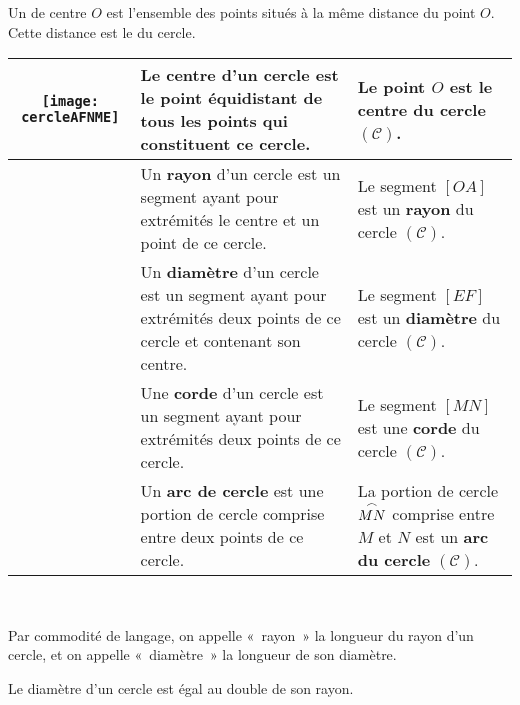 \begin{methode*1}

\begin{definition}
Un \textbf{} de centre $O$ est l'ensemble des points situés à la même distance du point $O$. 
Cette distance est le \textbf{} du cercle.
\end{definition}

\begin{tabular}{|c|p{5cm}|p{3cm}|}
\hline
 \multirow{5}{*}{\texttt{[image: cercleAFNME]}} & Le \textcolor{C2}{\textbf{centre}} d'un cercle est le point équidistant de tous les points qui constituent ce cercle. & Le point $O$ est le \textcolor{C2}{\textbf{centre}} du cercle $(\mathcal{C})$.\\ \hline
 & Un \textcolor{J1}{\textbf{rayon}} d'un cercle est un segment ayant pour extrémités le centre et un point de ce cercle. & Le segment $[OA]$ est un  \textcolor{J1}{\textbf{rayon}} du cercle $(\mathcal{C})$.\\ \hline
 & Un  \textcolor{H1}{\textbf{diamètre}} d'un cercle est un segment ayant pour extrémités deux points de ce cercle et contenant son centre. & Le segment $[EF]$ est un  \textcolor{H1}{\textbf{diamètre}} du cercle $(\mathcal{C})$.\\ \hline
 & Une  \textcolor{PartieFonction}{\textbf{corde}} d'un cercle est un segment ayant pour extrémités deux points de ce cercle. & Le segment $[MN]$ est une  \textcolor{PartieFonction}{\textbf{corde}} du cercle $(\mathcal{C})$.\\ \hline
 & Un  \textcolor{B2}{\textbf{arc de cercle}} est une portion de cercle comprise entre deux points de ce cercle. & La portion de cercle $\overset{\huge{\frown}}{MN}$ comprise entre $M$ et $N$ est un  \textcolor{B2}{\textbf{arc du cercle}} $(\mathcal{C})$.\\ \hline
  \end{tabular} \\
  
 \begin{remarque}
 Par commodité de langage, on appelle « rayon » la longueur du rayon d'un cercle, et  on appelle « diamètre » la longueur de son diamètre.
  \end{remarque}
  
 \begin{remarque}
 Le diamètre d'un cercle est égal au double de son rayon.
  \end{remarque}


\end{methode*1}
